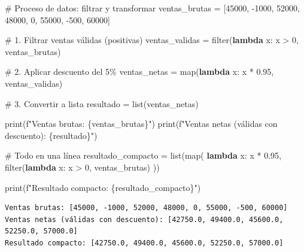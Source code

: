 \documentclass[
  doc,
  floatsintext,
  longtable,
  a4paper,
  nolmodern,
  notxfonts,
  notimes,
  12pt,
  colorlinks=true,linkcolor=blue,citecolor=blue,urlcolor=blue]{apa7}
\newenvironment{Shaded}{\begin{snugshade}}{\end{snugshade}}
\newcommand{\BuiltInTok}[1]{\textcolor[rgb]{0.00,0.23,0.31}{#1}}
\newcommand{\CommentTok}[1]{\textcolor[rgb]{0.37,0.37,0.37}{#1}}
\newcommand{\DecValTok}[1]{\textcolor[rgb]{0.68,0.00,0.00}{#1}}
\newcommand{\FloatTok}[1]{\textcolor[rgb]{0.68,0.00,0.00}{#1}}
\newcommand{\KeywordTok}[1]{\textcolor[rgb]{0.00,0.23,0.31}{\textbf{#1}}}
\newcommand{\NormalTok}[1]{\textcolor[rgb]{0.00,0.23,0.31}{#1}}
\newcommand{\OperatorTok}[1]{\textcolor[rgb]{0.37,0.37,0.37}{#1}}
\newcommand{\SpecialCharTok}[1]{\textcolor[rgb]{0.37,0.37,0.37}{#1}}
\newcommand{\SpecialStringTok}[1]{\textcolor[rgb]{0.13,0.47,0.30}{#1}}
\begin{document}
\begin{Shaded}
\begin{Highlighting}[]
\CommentTok{\# Proceso de datos: filtrar y transformar}
\NormalTok{ventas\_brutas }\OperatorTok{=}\NormalTok{ [}\DecValTok{45000}\NormalTok{, }\OperatorTok{{-}}\DecValTok{1000}\NormalTok{, }\DecValTok{52000}\NormalTok{, }\DecValTok{48000}\NormalTok{, }\DecValTok{0}\NormalTok{, }\DecValTok{55000}\NormalTok{, }\OperatorTok{{-}}\DecValTok{500}\NormalTok{, }\DecValTok{60000}\NormalTok{]}

\CommentTok{\# 1. Filtrar ventas válidas (positivas)}
\NormalTok{ventas\_validas }\OperatorTok{=} \BuiltInTok{filter}\NormalTok{(}\KeywordTok{lambda}\NormalTok{ x: x }\OperatorTok{\textgreater{}} \DecValTok{0}\NormalTok{, ventas\_brutas)}

\CommentTok{\# 2. Aplicar descuento del 5\%}
\NormalTok{ventas\_netas }\OperatorTok{=} \BuiltInTok{map}\NormalTok{(}\KeywordTok{lambda}\NormalTok{ x: x }\OperatorTok{*} \FloatTok{0.95}\NormalTok{, ventas\_validas)}

\CommentTok{\# 3. Convertir a lista}
\NormalTok{resultado }\OperatorTok{=} \BuiltInTok{list}\NormalTok{(ventas\_netas)}

\BuiltInTok{print}\NormalTok{(}\SpecialStringTok{f"Ventas brutas: }\SpecialCharTok{\{}\NormalTok{ventas\_brutas}\SpecialCharTok{\}}\SpecialStringTok{"}\NormalTok{)}
\BuiltInTok{print}\NormalTok{(}\SpecialStringTok{f"Ventas netas (válidas con descuento): }\SpecialCharTok{\{}\NormalTok{resultado}\SpecialCharTok{\}}\SpecialStringTok{"}\NormalTok{)}

\CommentTok{\# Todo en una línea}
\NormalTok{resultado\_compacto }\OperatorTok{=} \BuiltInTok{list}\NormalTok{(}\BuiltInTok{map}\NormalTok{(}
    \KeywordTok{lambda}\NormalTok{ x: x }\OperatorTok{*} \FloatTok{0.95}\NormalTok{,}
    \BuiltInTok{filter}\NormalTok{(}\KeywordTok{lambda}\NormalTok{ x: x }\OperatorTok{\textgreater{}} \DecValTok{0}\NormalTok{, ventas\_brutas)}
\NormalTok{))}

\BuiltInTok{print}\NormalTok{(}\SpecialStringTok{f"Resultado compacto: }\SpecialCharTok{\{}\NormalTok{resultado\_compacto}\SpecialCharTok{\}}\SpecialStringTok{"}\NormalTok{)}
\end{Highlighting}
\end{Shaded}

\begin{verbatim}
Ventas brutas: [45000, -1000, 52000, 48000, 0, 55000, -500, 60000]
Ventas netas (válidas con descuento): [42750.0, 49400.0, 45600.0, 52250.0, 57000.0]
Resultado compacto: [42750.0, 49400.0, 45600.0, 52250.0, 57000.0]
\end{verbatim}
\end{document}
